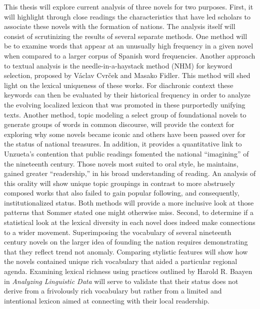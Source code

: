\documentclass[12pt]{report}
\begin{document}
This thesis will explore  current analysis of three novels for two purposes. 
First, it will highlight through close readings the characteristics that have led scholars to associate these novels with the formation of nations. 
The analysis itself will consist of scrutinizing the results of several separate methods. 
One method will be to examine words that appear at an unusually high frequency in a given novel when compared to a larger corpus of Spanish word frequencies. 
Another approach to textual analysis is the needle-in-a-haystack method (NHM) for keyword selection, proposed by Václav Cvrček and Masako Fidler. 
This method will shed light on the lexical uniqueness of these works\nocite{Cvrcek2014}. 
For diachronic context these keywords can then be evaluated by their historical frequency in order to analyze the evolving localized lexicon that was promoted in these purportedly unifying texts. 
Another method, topic modeling a select group of foundational novels to generate groups of words in common discourse, will provide the context for exploring why some novels became iconic and others have been passed over for the status of national treasures. 
In addition, it provides a quantitative link to Unzueta's contention that public readings fomented the national \enquote{imagining} of the nineteenth century. 
Those novels most suited to oral style, he maintains, gained greater \enquote{readership,} in his broad understanding of reading. 
An analysis of this orality will show unique topic groupings in contrast to more abstrusely composed works that also failed to gain popular following, and consequently, institutionalized status. 
Both methods will provide a more inclusive look at those patterns that Sommer stated one might otherwise miss. 
Second, to determine if a statistical look at the lexical diversity  in each novel does indeed make connections to a wider movement. 
Superimposing the vocabulary of several nineteenth century novels on the larger idea of founding the nation requires demonstrating that they reflect trend not anomaly. 
Comparing stylistic features will show how the novels contained unique rich vocabulary that aided a particular regional agenda. 
Examining lexical richness using practices outlined by Harold R. Baayen in \textit{Analyzing Linguistic Data} will serve to validate that their status does not derive from a frivolously rich vocabulary but rather from a limited and intentional lexicon aimed at connecting with their local readership\nocite{Baayen2008}.
\end{document}
